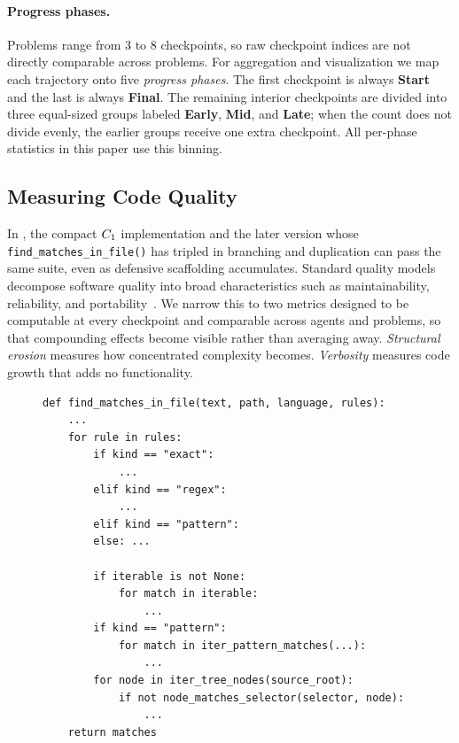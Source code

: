 \paragraph{Progress phases.} Problems range from 3 to 8 checkpoints, so raw checkpoint indices are not directly comparable across problems. For aggregation and visualization we map each trajectory onto five \emph{progress phases}. The first checkpoint is always \textbf{Start} and the last is always \textbf{Final}. The remaining interior checkpoints are divided into three equal-sized groups labeled \textbf{Early}, \textbf{Mid}, and \textbf{Late}; when the count does not divide evenly, the earlier groups receive one extra checkpoint. All per-phase statistics in this paper use this binning.

\subsection{Measuring Code Quality}\label{sec:quality-dims}

In \codesearch{}, the compact $C_{1}$ implementation and the later version whose \texttt{find\_matches\_in\_file()} has tripled in branching and duplication can pass the same suite, even as defensive scaffolding accumulates. Standard quality models decompose software quality into broad characteristics such as maintainability, reliability, and portability~\citep{iso25010}. We narrow this to two metrics designed to be computable at every checkpoint and comparable across agents and problems, so that compounding effects become visible rather than averaging away. \emph{Structural erosion} measures how concentrated complexity becomes. \emph{Verbosity} measures code growth that adds no functionality.

\begin{figure}[t]
\begin{lstlisting}[caption={Structurally eroded \texttt{find\_matches\_in\_file()} in \codesearch{} at $\ckpt{5}$ (117 lines total). Nearly all decision-point mass ends up in one function.},label={fig:dispatch-erosion}]
def find_matches_in_file(text, path, language, rules):
    ...
    for rule in rules:
        if kind == "exact":
            ...
        elif kind == "regex":
            ...
        elif kind == "pattern":
        else: ...

        if iterable is not None:
            for match in iterable:
                ...
        if kind == "pattern":
            for match in iter_pattern_matches(...):
                ...
        for node in iter_tree_nodes(source_root):
            if not node_matches_selector(selector, node):
                ...
    return matches
\end{lstlisting}
\end{figure}

